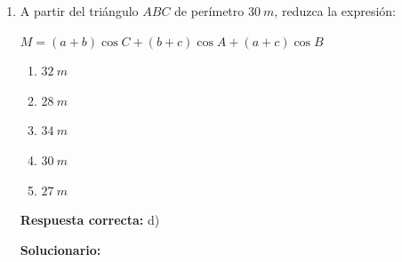 \begin{enumerate}
	\vspace{2mm}
	\textbf{Solucionario:}\\
	
	Analicemos en la circunferencia unitaria:
	
	$\theta\in\left[\dfrac{7\pi}{6},\dfrac{11\pi}{6}\right]\ ;\ \left[\dfrac{7\pi}{6},\dfrac{11\pi}{6}\right]=[210^\circ,330^\circ]$
	
	$\cot 210^\circ=\cot 30^\circ=\sqrt{3}$
	
	$\cot 330^\circ=-\cot 30^\circ=-\sqrt{3}$
	
	$210^\circ\leq \theta\leq 330^\circ$
	
	$\cot 210^\circ\geq \cot\theta\geq \cot 330^\circ$
	
	$\sqrt{3}\geq \cot\theta\geq -\sqrt{3}$
	
	$\sqrt{3}\cdot\sqrt{3}\geq \sqrt{3}\cot\theta\geq -\sqrt{3}(\sqrt{3})$
	
	$3\geq \sqrt{3}\cot\theta\geq -3$
	
	$3+3\geq \sqrt{3}\cot\theta+3\geq -3+3$
	
	$6\geq M\geq 0$
	
	Suma:
	
	
	\vspace{6mm}
	
	\item A partir del triángulo $ABC$ de perímetro $30\ m$, reduzca la expresión:
	
	$M=(a+b)\cos C+(b+c)\cos A+(a+c)\cos B$
	
	\begin{enumerate}[label=\alph*)]
		\item $32\ m$
		\item $28\ m$
		\item $34\ m$
		\item $30\ m$
		\item $27\ m$
	\end{enumerate}
	\textbf{Respuesta correcta:} d)
	
	\vspace{2mm}
	\textbf{Solucionario:}\\
	
\end{enumerate}
